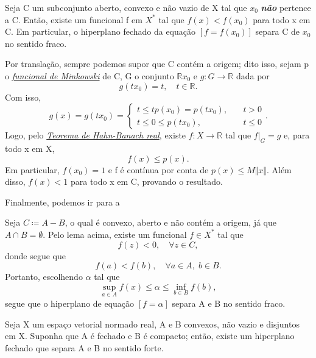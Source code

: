 \documentclass[../functional_analysis.tex]{subfiles}
\begin{document}
\begin{lemma*}
	Seja C um subconjunto aberto, convexo e não vazio de X tal que \(x_{0}\) \textit{\textbf{não}} pertence a C. Então, existe um funcional f em \(X^{*}\) tal que \(f(x)<f(x_{0})\) para todo x em C. Em particular, o hiperplano fechado da equação \([f=f(x_{0})]\) separa C de \(x_{0}\) no sentido fraco.
\end{lemma*}
\begin{proof*}
	Por translação, sempre podemos supor que C contém a origem; dito isso, sejam p o \hyperlink{minkowski_functional}{\textit{funcional de Minkowski}} de C, G o conjunto \(\mathbb{R}x_{0}\) e \(g:G\rightarrow \mathbb{R}\) dada por
	\[
		g(tx_{0})=t,\quad t\in \mathbb{R}.
	\]
	Com isso,
	\[
		g(x)=g(tx_{0}) = \left\{\begin{array}{ll}
			t\leq t p(x_{0})=p(tx_{0}), & \quad t>0     \\
			t\leq 0\leq p(tx_{0}),      & \quad t\leq 0
		\end{array}\right..
	\]
	Logo, pelo \hyperlink{hahn_banach}{\textit{Teorema de Hahn-Banach real}}, existe \(f:X\rightarrow \mathbb{R}\) tal que \(f|_{G}=g\) e, para todo x em X,
	\[
		f(x)\leq p(x).
	\]
	Em particular, \(f(x_{0})=1\) e f é contínua por conta de \(p(x)\leq M\Vert x \Vert.\) Além disso, \(f(x)<1\) para todo x em C, provando o resultado. \qedsymbol
\end{proof*}
Finalmente, podemos ir para a
\begin{proof*}
	Seja \(C\coloneqq A-B\), o qual é convexo, aberto e não contém a origem, já que \(A\cap B = \emptyset \). Pelo lema acima, existe um funcional \(f\in X^{*}\) tal que
	\[
		f(z)<0,\quad \forall z\in C,
	\]
	donde segue que
	\[
		f(a)<f(b),\quad \forall a\in A,\; b\in B.
	\]
	Portanto, escolhendo \(\alpha \) tal que
	\[
		\sup_{a\in A}f(x)\leq \alpha \leq \inf_{b\in B}f(b),
	\]
	segue que o hiperplano de equação \([f=\alpha ]\) separa A e B no sentido fraco. \qedsymbol
\end{proof*}
\hypertarget{second_geometric_hahn_banach}{
	\begin{theorem*}
		Seja X um espaço vetorial normado real, A e B convexos, não vazio e disjuntos em X. Suponha que A é fechado e B é compacto; então, existe um hiperplano fechado que separa A e B no sentido forte.
	\end{theorem*}
}
\end{document}
